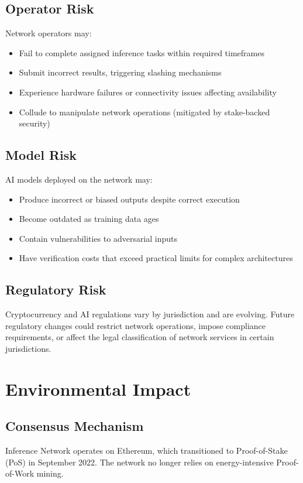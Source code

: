 \documentclass[conference]{IEEEtran}
\begin{document}
\subsection{Operator Risk}
Network operators may:
\begin{itemize}
\item Fail to complete assigned inference tasks within required timeframes
\item Submit incorrect results, triggering slashing mechanisms
\item Experience hardware failures or connectivity issues affecting availability
\item Collude to manipulate network operations (mitigated by stake-backed security)
\end{itemize}

\subsection{Model Risk}
AI models deployed on the network may:
\begin{itemize}
\item Produce incorrect or biased outputs despite correct execution
\item Become outdated as training data ages
\item Contain vulnerabilities to adversarial inputs
\item Have verification costs that exceed practical limits for complex architectures
\end{itemize}

\subsection{Regulatory Risk}
Cryptocurrency and AI regulations vary by jurisdiction and are evolving. Future regulatory changes could restrict network operations, impose compliance requirements, or affect the legal classification of network services in certain jurisdictions.

\section{Environmental Impact}

\subsection{Consensus Mechanism}
Inference Network operates on Ethereum, which transitioned to Proof-of-Stake (PoS) in September 2022. The network no longer relies on energy-intensive Proof-of-Work mining.
\end{document}
